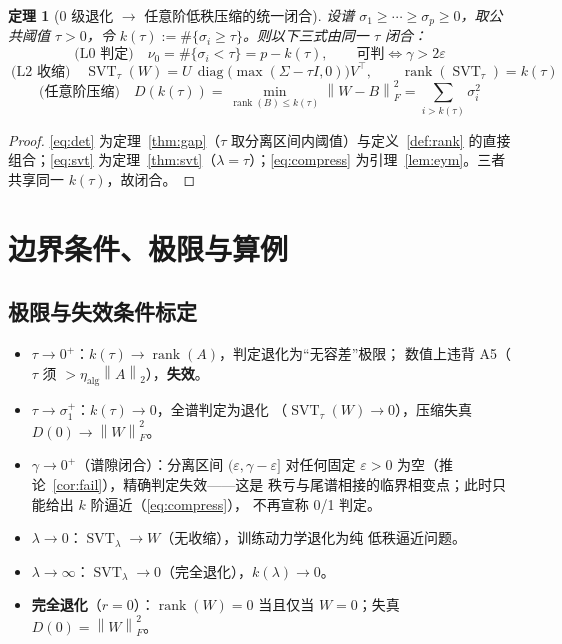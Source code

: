 \documentclass[UTF8,11pt,a4paper]{ctexart}
\theoremstyle{plain}
\newtheorem{theorem}{定理}
\theoremstyle{definition}
\theoremstyle{remark}
\newcommand{\rank}{\operatorname{rank}}
\newcommand{\diag}{\operatorname{diag}}
\newcommand{\SVT}{\operatorname{SVT}}
\newcommand{\Fnorm}[1]{\left\lVert #1\right\rVert_F}
\newcommand{\Tnorm}[1]{\left\lVert #1\right\rVert_2}
\begin{document}
\begin{theorem}[0 级退化 $\to$ 任意阶低秩压缩的统一闭合]\label{thm:unified}
设谱 $\sigma_1\ge\cdots\ge\sigma_p\ge0$，取公共阈值 $\tau>0$，令
$k(\tau):=\#\{\sigma_i\ge\tau\}$。则以下三式由同一 $\tau$ 闭合：
\begin{equation}\label{eq:det}
\boxed{\ \text{(L0 判定)}\quad
\nu_0=\#\{\sigma_i<\tau\}=p-k(\tau),
\qquad\text{可判}\iff\gamma>2\varepsilon\ }
\end{equation}
\begin{equation}\label{eq:svt}
\boxed{\ \text{(L2 收缩)}\quad
\SVT_\tau(W)=U\,\diag\!\big(\max(\Sigma-\tau I,0)\big)V^\top,
\qquad \rank(\SVT_\tau)=k(\tau)\ }
\end{equation}
\begin{equation}\label{eq:compress}
\boxed{\ \text{(任意阶压缩)}\quad
D(k(\tau))=\min_{\rank(B)\le k(\tau)}\Fnorm{W-B}^2
=\sum_{i>k(\tau)}\sigma_i^2\ }
\end{equation}
\end{theorem}
\begin{proof}
\eqref{eq:det} 为定理~\ref{thm:gap}（$\tau$ 取分离区间内阈值）与定义~\ref{def:rank}
的直接组合；\eqref{eq:svt} 为定理~\ref{thm:svt}（$\lambda=\tau$）；\eqref{eq:compress}
为引理~\ref{lem:eym}。三者共享同一 $k(\tau)$，故闭合。
\end{proof}

\section{边界条件、极限与算例}\label{sec:boundary}

\subsection{极限与失效条件标定}

\begin{itemize}
\item \textbf{$\tau\to0^{+}$}：$k(\tau)\to\rank(A)$，判定退化为“无容差”极限；
  数值上违背 A5（$\tau$ 须 $>\eta_{\mathrm{alg}}\Tnorm{A}$），\textbf{失效}。
\item \textbf{$\tau\to\sigma_1^{+}$}：$k(\tau)\to0$，全谱判定为退化
  （$\SVT_\tau(W)\to0$），压缩失真 $D(0)\to\Fnorm{W}^2$。
\item \textbf{$\gamma\to0^{+}$}（谱隙闭合）：分离区间 $(\varepsilon,\gamma-\varepsilon]$
  对任何固定 $\varepsilon>0$ 为空（推论~\ref{cor:fail}），精确判定失效——这是
  秩亏与尾谱相接的临界相变点；此时只能给出 $k$ 阶逼近（\eqref{eq:compress}），
  不再宣称 0/1 判定。
\item \textbf{$\lambda\to0$}：$\SVT_\lambda\to W$（无收缩），训练动力学退化为纯
  低秩逼近问题。
\item \textbf{$\lambda\to\infty$}：$\SVT_\lambda\to0$（完全退化），$k(\lambda)\to0$。
\item \textbf{完全退化}（$r=0$）：$\rank(W)=0$ 当且仅当 $W=0$；失真
  $D(0)=\Fnorm{W}^2$。
\end{itemize}
\end{document}
